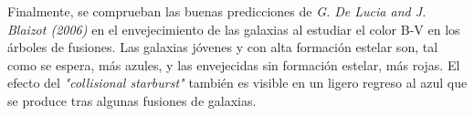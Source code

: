 Finalmente, se comprueban las buenas predicciones de \textit{G. De Lucia and J. Blaizot (2006)} \cite{2} en el envejecimiento de las galaxias al estudiar el color B-V en los árboles de fusiones. Las galaxias jóvenes y con alta formación estelar son, tal como se espera, más azules, y las envejecidas sin formación estelar, más rojas. El efecto del \textit{"collisional starburst"} también es visible en un ligero regreso al azul que se produce tras algunas fusiones de galaxias.
